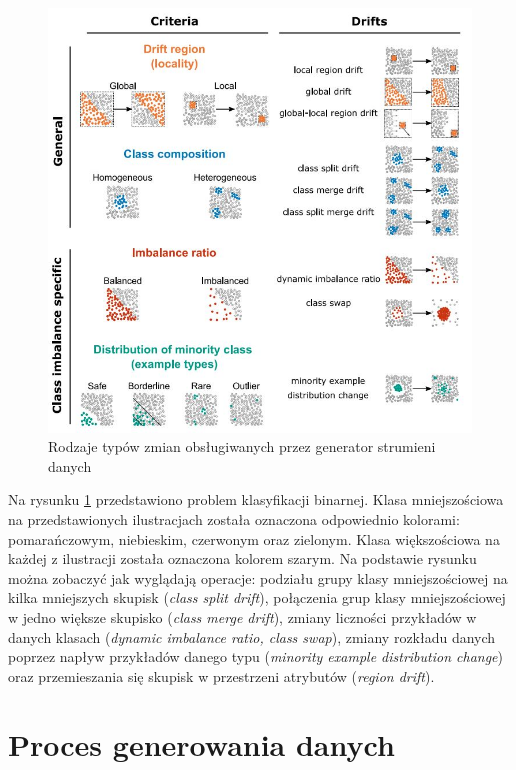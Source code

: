 \begin{figure}[h] 
    \centering
    \includegraphics[width=15cm]{figures/drift_criteria.JPG}
    \caption{Rodzaje typów zmian obsługiwanych przez generator strumieni danych \cite{Article:TypyPrzykladow}}\label{Figure:DriftCriteria}
\end{figure}

\noindent Na rysunku \ref{Figure:DriftCriteria} przedstawiono problem klasyfikacji binarnej. Klasa mniejszościowa na przedstawionych ilustracjach została oznaczona odpowiednio kolorami: pomarańczowym, niebieskim, czerwonym oraz zielonym. Klasa większościowa na każdej z ilustracji została oznaczona kolorem szarym. Na podstawie rysunku można zobaczyć jak wyglądają operacje: podziału grupy klasy mniejszościowej na kilka mniejszych skupisk (\textit{class split drift}), połączenia grup klasy mniejszościowej w jedno większe skupisko (\textit{class merge drift}), zmiany liczności przykładów w danych klasach (\textit{dynamic imbalance ratio, class swap}), zmiany rozkładu danych poprzez napływ przykładów danego typu (\textit{minority example distribution change}) oraz przemieszania się skupisk w przestrzeni atrybutów (\textit{region drift}). 

\section{Proces generowania danych}

